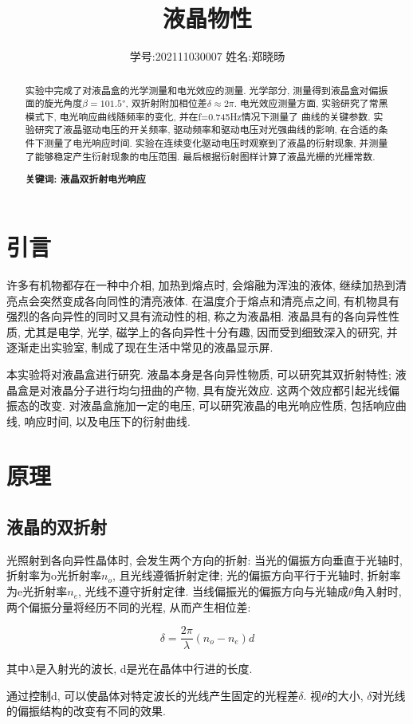 \documentclass[12pt,a4paper]{article}
\title{\vspace{-4cm}\Large 液晶物性}  %
\author{\kaishu 学号:202111030007 \hspace{2cm} 姓名:郑晓旸}   %
\date{}
\newcommand{\be}[1]{
    \begin{equation}
        #1
    \end{equation}
}
\begin{document}
\maketitle

\begin{abstract}
    实验中完成了对液晶盒的光学测量和电光效应的测量. 光学部分, 测量得到液晶盒对偏振面的旋光角度$\beta=101.5°$, 双折射附加相位差$\delta \approx 2\pi$. 电光效应测量方面, 实验研究了常黑模式下, 电光响应曲线随频率的变化, 并在f=0.745Hz情况下测量了
曲线的关键参数. 实验研究了液晶驱动电压的开关频率, 驱动频率和驱动电压对光强曲线的影响, 在合适的条件下测量了电光响应时间. 实验在连续变化驱动电压时观察到了液晶的衍射现象, 并测量了能够稳定产生衍射现象的电压范围. 最后根据衍射图样计算了液晶光栅的光栅常数. 

\textbf{关键词: 液晶\quad 双折射\quad 电光响应}
\end{abstract}

\section{引言}
许多有机物都存在一种中介相, 加热到熔点时, 会熔融为浑浊的液体, 继续加热到清亮点会突然变成各向同性的清亮液体. 
在温度介于熔点和清亮点之间, 有机物具有强烈的各向异性的同时又具有流动性的相, 称之为液晶相. 液晶具有的各向异性性质, 尤其是电学, 光学, 磁学上的各向异性十分有趣, 因而受到细致深入的研究, 并逐渐走出实验室, 制成了现在生活中常见的液晶显示屏. 

本实验将对液晶盒进行研究. 液晶本身是各向异性物质, 可以研究其双折射特性; 液晶盒是对液晶分子进行均匀扭曲的产物, 具有旋光效应. 这两个效应都引起光线偏振态的改变. 
对液晶盒施加一定的电压, 可以研究液晶的电光响应性质, 包括响应曲线, 响应时间, 以及电压下的衍射曲线.
\section{原理}
\subsection{液晶的双折射}
光照射到各向异性晶体时, 会发生两个方向的折射: 当光的偏振方向垂直于光轴时, 折射率为o光折射率$n_{o}$, 且光线遵循折射定律; 光的偏振方向平行于光轴时, 折射率为e光折射率$n_{e}$, 光线不遵守折射定律. 当线偏振光的偏振方向与光轴成$\theta$角入射时, 两个偏振分量将经历不同的光程, 从而产生相位差: 
\be{\delta=\frac{2\pi}{\lambda}(n_{o}-n_{e})d}
其中$\lambda$是入射光的波长, d是光在晶体中行进的长度. 

通过控制d, 可以使晶体对特定波长的光线产生固定的光程差$\delta$. 视$\theta$的大小, $\delta$对光线的偏振结构的改变有不同的效果. 
\end{document}
